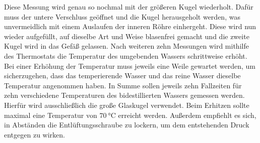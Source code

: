 Diese Messung wird genau so nochmal mit der größeren Kugel wiederholt. 
Dafür muss der untere Verschluss geöffnet und die Kugel herausgeholt werden, was unvermeidlich mit einem Auslaufen der inneren 
Röhre einhergeht. 
Diese wird nun wieder aufgefüllt, auf dieselbe Art und Weise blasenfrei gemacht und die zweite Kugel wird in das Gefäß gelassen. 
Nach weiteren zehn Messungen wird mithilfe des Thermostats die Temperatur des umgebenden Wassers schrittweise erhöht. 
Bei einer Erhöhung der Temperatur muss jeweils eine Weile gewartet werden, um sicherzugehen, dass das temperierende Wasser 
und das reine Wasser dieselbe Temperatur angenommen haben. 
In Summe sollen jeweils zehn Fallzeiten für zehn verschiedene Temperaturen des bidestillierten Wassers gemessen werden. 
Hierfür wird ausschließlich die große Glaskugel verwendet. 
Beim Erhitzen sollte maximal eine Temperatur von $\SI{70}{\celsius}$ erreicht werden. 
Außerdem empfiehlt es sich, in Abständen die Entlüftungsschraube zu lockern, um dem entstehenden Druck entgegen zu wirken. 
